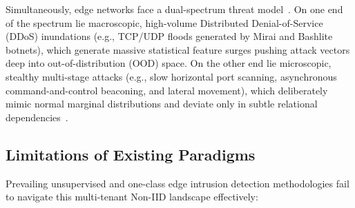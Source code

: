 Simultaneously, edge networks face a dual-spectrum threat model~\cite{mirsky2018kitsune,sarhan2023evaluating}. On one end of the spectrum lie macroscopic, high-volume Distributed Denial-of-Service (DDoS) inundations (e.g., TCP/UDP floods generated by Mirai and Bashlite botnets), which generate massive statistical feature surges pushing attack vectors deep into out-of-distribution (OOD) space. On the other end lie microscopic, stealthy multi-stage attacks (e.g., slow horizontal port scanning, asynchronous command-and-control beaconing, and lateral movement), which deliberately mimic normal marginal distributions and deviate only in subtle relational dependencies~\cite{goodge2022lunar,jin2021anemone}.

\subsection{Limitations of Existing Paradigms}
Prevailing unsupervised and one-class edge intrusion detection methodologies fail to navigate this multi-tenant Non-IID landscape effectively:
